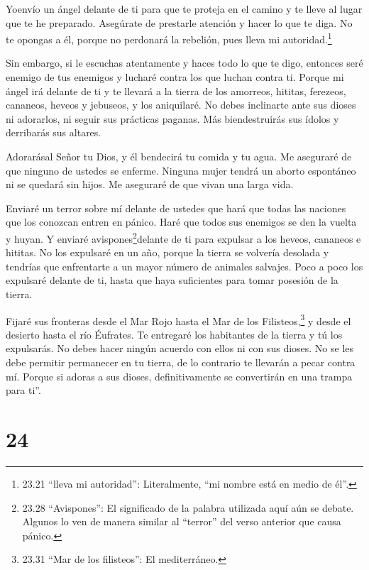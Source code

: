  Yoenvío un ángel delante de ti para que te proteja en el
camino y te lleve al lugar que te he preparado.  Asegúrate
de prestarle atención y hacer lo que te diga. No te opongas a él, porque
no perdonará la rebelión, pues lleva mi autoridad.\footnote{23.21
  ``lleva mi autoridad'': Literalmente, ``mi nombre está en medio de
  él''.}

 Sin embargo, si le escuchas atentamente y haces todo lo
que te digo, entonces seré enemigo de tus enemigos y lucharé contra los
que luchan contra ti.  Porque mi ángel irá delante de ti y
te llevará a la tierra de los amorreos, hititas, ferezeos, cananeos,
heveos y jebuseos, y los aniquilaré.  No debes inclinarte
ante sus dioses ni adorarlos, ni seguir sus prácticas paganas. Más
biendestruirás sus ídolos y derribarás sus altares.

 Adorarásal Señor tu Dios, y él bendecirá tu comida y tu
agua. Me aseguraré de que ninguno de ustedes se enferme. 
Ninguna mujer tendrá un aborto espontáneo ni se quedará sin hijos. Me
aseguraré de que vivan una larga vida.

 Enviaré un terror sobre mí delante de ustedes que hará que
todas las naciones que los conozcan entren en pánico. Haré que todos sus
enemigos se den la vuelta y huyan.  Y enviaré
avispones\footnote{23.28 ``Avispones'': El significado de la palabra
  utilizada aquí aún se debate. Algunos lo ven de manera similar al
  ``terror'' del verso anterior que causa pánico.}delante de ti para
expulsar a los heveos, cananeos e hititas.  No los
expulsaré en un año, porque la tierra se volvería desolada y tendrías
que enfrentarte a un mayor número de animales salvajes. 
Poco a poco los expulsaré delante de ti, hasta que haya suficientes para
tomar posesión de la tierra.

 Fijaré sus fronteras desde el Mar Rojo hasta el Mar de los
Filisteos,\footnote{23.31 ``Mar de los filisteos'': El mediterráneo.} y
desde el desierto hasta el río Éufrates. Te entregaré los habitantes de
la tierra y tú los expulsarás.  No debes hacer ningún
acuerdo con ellos ni con sus dioses.  No se les debe
permitir permanecer en tu tierra, de lo contrario te llevarán a pecar
contra mí. Porque si adoras a sus dioses, definitivamente se convertirán
en una trampa para ti''.

\hypertarget{section-23}{%
\section{24}\label{section-23}}

